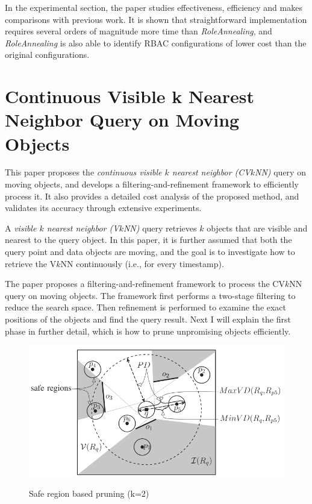 \documentclass[paper=a4, fontsize=18pt]{article} %
\numberwithin{equation}{section} %
\numberwithin{figure}{section} %
\numberwithin{table}{section} %
\begin{document}
In the experimental section, the paper studies effectiveness, efficiency and makes comparisons with previous work. It is shown that straightforward implementation requires several orders of magnitude more time than \emph{RoleAnnealing}, and \emph{RoleAnnealing} is also able to identify RBAC configurations of lower cost than the original configurations.

\section{Continuous Visible k Nearest Neighbor Query on Moving Objects \cite{WZXQGY14}}

This paper proposes the \emph{continuous visible $k$ nearest neighbor (CV$k$NN)} query on moving objects, and develops a filtering-and-refinement framework to efficiently process it. It also provides a detailed cost analysis of the proposed method, and validates its accuracy through extensive experiments.

A \emph{visible $k$ nearest neighbor (V$k$NN)} query retrieves $k$ objects that are visible and nearest to the query object. In this paper, it is further assumed that both the query point and data objects are moving, and the goal is to investigate how to retrieve the V$k$NN continuously (i.e., for every timestamp).

The paper proposes a filtering-and-refinement framework to process the CV$k$NN query on moving objects. The framework first performs a two-stage filtering to reduce the search space. Then refinement is performed to examine the exact positions of the objects and find the query result. Next I will explain the first phase in further detail, which is how to prune unpromising objects efficiently.

\begin{figure}[h]
  \centering
  \includegraphics[width=.7\linewidth]{8_1_saferegion.png}\\
  \caption{Safe region based pruning (k=2)}\label{fig:saferegion}
\end{figure}
\end{document}
